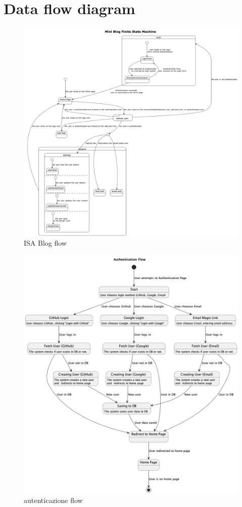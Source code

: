 \documentclass{article}
\begin{document}
\section{Data flow diagram}
\label{sec:data_flow_diagram}


\begin{figure}[h]
    \centering
    \includegraphics[width=1.3\textwidth]{ingblog_flow}
    \caption{ISA Blog flow}
    \label{fig:figure5}
\end{figure}

\begin{figure}[h]
    \lefting
    \includegraphics[width=1.3\textwidth]{authentication_flow}
    \caption{autenticazione flow}
    \label{fig:figure4}
\end{figure}
\end{document}
